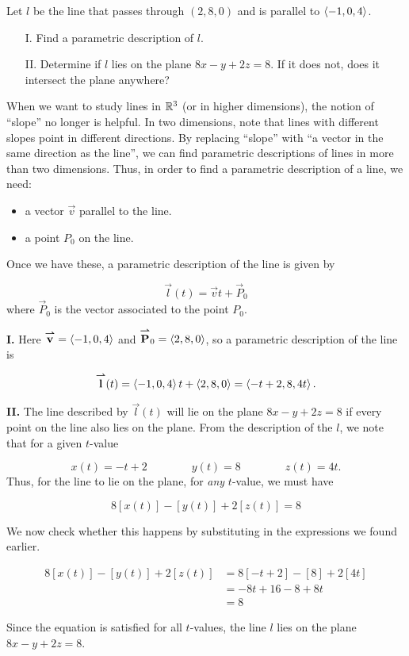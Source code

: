 \documentclass[noauthor, handout]{ximera}
\begin{document}
\begin{problem}
Let $l$ be the line that passes through $(2,8,0)$ and is parallel to $\left\langle -1,0,4\right\rangle$.

\begin{itemize}
\item[I.] Find a parametric description of $l$.
\item[II.] Determine if $l$ lies on the plane $8x-y+2z=8$.  If it does not, does it intersect the plane anywhere?
\end{itemize} 

\begin{freeResponse}
When we want to study lines in $\mathbb R^3$ (or in higher dimensions), the notion of ``slope'' no longer is helpful.  In two dimensions, note that lines with different slopes point in different directions.  By replacing ``slope'' with ``a vector in the same direction as the line'', we can find parametric descriptions of lines in more than two dimensions.  Thus, in order to find a parametric description of a line, we need:

\begin{itemize}
\item a vector $\vec{v}$ parallel to the line.
\item a point $P_0$ on the line.
\end{itemize}

Once we have these, a parametric description of the line is given by 

\[
\vec{l}(t) = \vec{v}t+\vec{P}_0
\]
where $\vec{P}_0$ is the vector associated to the point $P_0$.

\textbf{I.} Here ${\overset{\boldsymbol{\rightharpoonup}}{\mathbf{v}}} = \left\langle -1,0,4\right\rangle$ and ${\overset{\boldsymbol{\rightharpoonup}}{\mathbf{P}}}_0 = \left\langle 2,8,0\right\rangle$, so a parametric description of the line is 

\[
{\overset{\boldsymbol{\rightharpoonup}}{\mathbf{l}}}(t) =  \left\langle -1,0,4\right\rangle t+\left\langle 2,8,0\right\rangle =  \left\langle -t+2,8,4t\right\rangle.
\]

\textbf{II.} The line described by $\vec{l}(t)$ will lie on the plane $8x-y+2z=8$ if every point on the line also lies on the plane.  From the description of the $l$, we note that for a given $t$-value

\[
x(t) = -t+2 \qquad \qquad y(t) =8 \qquad \qquad z(t)=4t.
\] 
Thus, for the line to lie on the plane, for \emph{any} $t$-value, we must have

\[
8[x(t)]-[y(t)]+2[z(t)]=8
\]

We now check whether this happens by substituting in the expressions we found earlier.

\begin{align*}
8[x(t)]-[y(t)]+2[z(t)]&=8[-t+2]-[8]+2[4t]\\
&= -8t+16-8+8t \\
&= 8
\end{align*}

Since the equation is satisfied for all $t$-values, the line $l$ lies on the plane $8x-y+2z=8$.
\end{freeResponse}
\end{problem}
\end{document}
